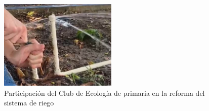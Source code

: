 \documentclass[12pt]{article}
\begin{document}
\begin{figure}[h!]
      \centering
      \includegraphics[width=0.5\textwidth]{imagenes/sprinkler.jpg}
      \caption{Participación del Club de Ecología de primaria en la reforma del sistema de riego}
      \label{fig:sprinkler}
\end{figure}
\end{document}
